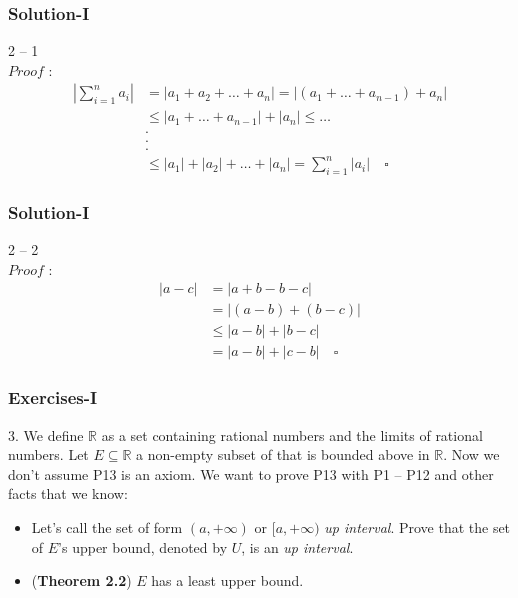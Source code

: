 \documentclass[12pt, t]{beamer}
\renewcommand{\emph}[1]{{\color{Turquoise3}\textsl{#1}}}
\begin{document}
\begin{frame}
    \frametitle{Solution-I}
2 -- 1\\
$Proof$ :
        \begin{equation*}
            \begin{split}
                |\sum^n_{i=1}a_i| &=|a_1+a_2+\dots+a_n|
                    =|(a_1+\dots+a_{n-1})+a_n|\\
                    &\leq |a_1+\dots+a_{n-1}|+|a_n|
                    \leq \dots\\
                    &.\\
                    &.\\
                    &.\\
                    &\leq |a_1|+|a_2|+\dots+|a_n|=\sum^n_{i=1}|a_i|\quad\square
            \end{split}
        \end{equation*}
\end{frame}

\begin{frame}
    \frametitle{Solution-I}
2 -- 2\\
$Proof$ :
        \begin{equation*}
            \begin{split}
                |a-c|&=|a+b-b-c|\\
                     &=|(a-b)+(b-c)|\\
                     &\leq|a-b|+|b-c|\\
                     &=|a-b|+|c-b| \quad \square
            \end{split}
        \end{equation*}
\end{frame}


\begin{frame}
    \frametitle{Exercises-I}
3. We define $\mathbb{R}$ as a set containing rational numbers and the limits of rational numbers. 
Let $E\subseteq \mathbb{R}$ a non-empty subset of that is bounded above in $\mathbb{R}$. Now we don't 
assume P13 is an axiom. We want to prove P13 with P1 -- P12 and other facts that we know:
\begin{itemize}
    \item Let's call the set of form $(a,+\infty)$ or $[a,+\infty)$ \emph{up interval}. Prove that the 
        set of $E$'s upper bound, denoted by $U$, is an \emph{up interval}.
    \item (\textbf{Theorem 2.2}) $E$ has a least upper bound.
\end{itemize}
\end{frame}
\end{document}
